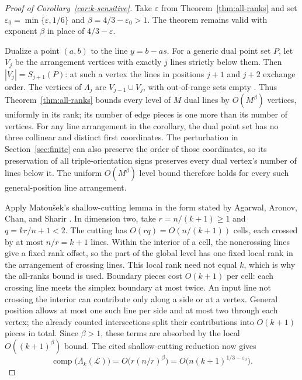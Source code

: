 \begin{proof}[Proof of Corollary~\ref{cor:k-sensitive}]
Take $\varepsilon$ from Theorem~\ref{thm:all-ranks} and set
$\varepsilon_0=\min\{\varepsilon,1/6\}$ and
$\beta=4/3-\varepsilon_0>1$. The theorem remains valid with exponent
$\beta$ in place of $4/3-\varepsilon$.

Dualize a point $(a,b)$ to the line $y=b-as$. For a generic dual point
set $P$, let $V_j$ be the arrangement vertices with exactly $j$ lines
strictly below them. Then $|V_j|=S_{j+1}(P)$: at such a vertex the lines
in positions $j+1$ and $j+2$ exchange order. The vertices of
$\Lambda_j$ are $V_{j-1}\cup V_j$, with out-of-range sets empty
\cite[Section~1, p.~2]{AgarwalAronovChanSharir1998}. Thus
Theorem~\ref{thm:all-ranks} bounds every level of $M$ dual lines by
$O(M^\beta)$ vertices, uniformly in its rank; its number of edge pieces
is one more than its number of vertices. For any line arrangement in
the corollary, the dual point set has no three collinear and distinct
first coordinates. The perturbation in Section~\ref{sec:finite} can
also preserve the order of those coordinates, so its preservation of
all triple-orientation signs preserves every dual vertex's number of
lines below it. The uniform $O(M^\beta)$ level bound therefore holds
for every such general-position line arrangement.

Apply Matou\v{s}ek's shallow-cutting lemma in the form stated by
Agarwal, Aronov, Chan, and Sharir
\cite[Lemma~3.2 and the following reduction, pp.~10--11]{AgarwalAronovChanSharir1998}.
In dimension two, take $r=n/(k+1)\ge1$ and
$q=kr/n+1<2$. The cutting has $O(rq)=O(n/(k+1))$ cells, each crossed
by at most $n/r=k+1$ lines. Within the interior of a cell, the
noncrossing lines give a fixed rank offset, so the part of the global
level has one fixed local rank in the arrangement of crossing lines.
This local rank need not
equal $k$, which is why the all-ranks bound is used. Boundary pieces
cost $O(k+1)$ per cell: each crossing line meets the simplex boundary
at most twice. An input line not crossing the interior can contribute
only along a side or at a vertex. General position allows at most one
such line per side and at most two through each vertex; the already
counted intersections split their contributions into $O(k+1)$ pieces
in total. Since $\beta>1$, these terms are absorbed by the local
$O((k+1)^\beta)$ bound. The cited shallow-cutting reduction now gives
\[
 \operatorname{comp}\bigl(\Lambda_k(\mathcal L)\bigr)
 =O\bigl(r(n/r)^\beta\bigr)
 =O\bigl(n(k+1)^{1/3-\varepsilon_0}\bigr).
\]


\end{proof}
